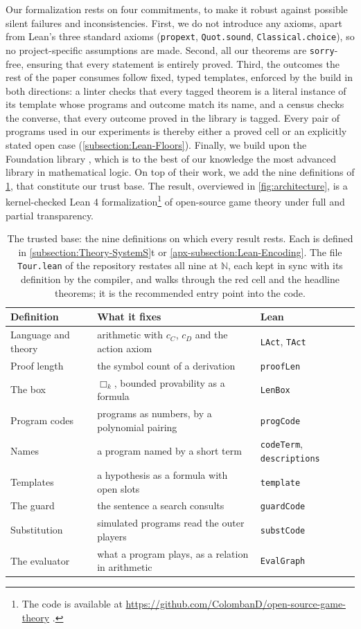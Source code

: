 \documentclass[twoside,11pt]{article}
\begin{document}
Our formalization rests on four commitments, to make it robust against possible silent failures and inconsistencies. First, we do not introduce any axioms, apart from Lean's three standard axioms (\texttt{propext}, \texttt{Quot.sound}, \texttt{Classical.choice}), so no project-specific assumptions are made. Second, all our theorems are \texttt{sorry}-free, ensuring that every statement is entirely proved. Third, the outcomes the rest of the paper consumes follow fixed, typed templates, enforced by the build in both directions: a linter checks that every tagged theorem is a literal instance of its template whose programs and outcome match its name, and a census checks the converse, that every outcome proved in the library is tagged. Every pair of programs used in our experiments is thereby either a proved cell or an explicitly stated open case (\cref{subsection:Lean-Floors}). Finally, we build upon the Foundation library \citep{foundation}, which is to the best of our knowledge the most advanced library in mathematical logic. On top of their work, we add the nine definitions of \cref{table:trusted-base}, that constitute our trust base. The result, overviewed in \cref{fig:architecture}, is a kernel-checked Lean 4 formalization\footnote{The code is available at \url{https://github.com/ColombanD/open-source-game-theory} \citep{osgt_code}.} of open-source game theory under full and partial transparency.

\begin{table}[h]\centering\small
\begin{tabular}{lll}\toprule
Definition & What it fixes & Lean \\\midrule
Language and theory & arithmetic with $c_C$, $c_D$ and the action axiom & \texttt{LAct}, \texttt{TAct} \\
Proof length & the symbol count of a derivation & \texttt{proofLen} \\
The box & $\Box_k$, bounded provability as a formula & \texttt{LenBox} \\
Program codes & programs as numbers, by a polynomial pairing & \texttt{progCode} \\
Names & a program named by a short term & \texttt{codeTerm}, \texttt{descriptions} \\
Templates & a hypothesis as a formula with open slots & \texttt{template} \\
The guard & the sentence a search consults & \texttt{guardCode} \\
Substitution & simulated programs read the outer players & \texttt{substCode} \\
The evaluator & what a program plays, as a relation in arithmetic & \texttt{EvalGraph} \\\bottomrule
\end{tabular}
\caption{The trusted base: the nine definitions on which every result rests. Each is defined in \cref{subsection:Theory-SystemS}t or \cref{apx-subsection:Lean-Encoding}. The file \texttt{Tour.lean} of the repository restates all nine at $\mathbb{N}$, each kept in sync with its definition by the compiler, and walks through the red cell and the headline theorems; it is the recommended entry point into the code.}
\label{table:trusted-base}
\end{table}
\end{document}
